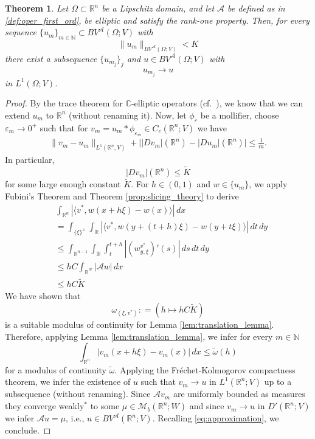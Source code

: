 \documentclass[11pt,reqno]{amsart}
\theoremstyle{plain}
\newtheorem{theorem}{Theorem}[section]
\theoremstyle{definition}
\theoremstyle{remark}
\numberwithin{equation}{section}
\newcommand{\R}{\mathbb{R}}
\newcommand{\C}{\mathbb{C}}
\newcommand{\N}{\mathbb{N}}
\newcommand{\M}{\mathcal{M}}
\newcommand{\A}{\mathcal{A}}
\newcommand{\e}{\varepsilon}
\newcommand{\1}{\mathbbm{1}} %
\begin{document}
\begin{theorem}
\label{thm:compactness}
    Let $\Omega \subset \R^n$ be a Lipschitz domain, and let $\A$ be defined as in \eqref{def:oper_first_ord}, be elliptic and satisfy the rank-one property. Then, for every sequence $\{u_m\}_{m \in \N} \subset BV^\A(\Omega; V)$ with 
    \[
        \| u_m \|_{BV^\A(\Omega;V)} < K
    \]
    there exist a subsequence $\{u_{m_j}\}_j$ and $u \in BV^\A(\Omega; V)$ with 
    \[
        u_{m_j} \to u
    \]
    in $L^1(\Omega; V)$. 
\end{theorem}
\begin{proof}    
    By the trace theorem for $\C$-elliptic operators (cf.\ \cite{BDG20}), we know that we can extend $u_m$ to $\R^n$ (without renaming it). Now, let $\phi_\e$ be a mollifier, choose $\e_m \to 0^+$ such that for $v_m = u_m \ast \phi_{\e_m} \in C_c(\R^n; V)$ we have
    \begin{align}\label{eq:approximation}
        \| v_m - u_m \|_{L^1(\R^n, V)} + \big||Dv_m|(\R^n) - |Du_m|(\R^n) \big| \leq \frac{1}{m}.
    \end{align}
    In particular, 
    \[
        |Dv_m|(\R^n) \leq \tilde K 
    \]
    for some large enough constant $\tilde K$. For $h \in (0,1)$ and $w \in \{u_m\}$, we apply Fubini's Theorem and Theorem \ref{prop:slicing_theory} to derive 
    \begin{align*}
        &\int_{\R^n} |\langle v^*, w(x + h \xi) - w(x) \rangle| \, dx \\
        &= \int_{\{\xi\}^\perp} \int_\R |\langle v^*, w(y + (t + h)\xi) - w(y + t\xi) \rangle| \, dt \, dy \\
        &\leq \int_{\R^{n-1}} \int_\R \int_t^{t + h} |(w^{v^*}_{y, \xi})'(s)| \, ds \, dt \, dy \\
        &\leq h C \int_{\R^N} |\A w| \, dx \\
        &\leq h C\tilde K
    \end{align*}
    We have shown that 
    \[
        \omega_{(\xi, v^*)} : = \left(h \mapsto h C\tilde K \right)
    \]
    is a suitable modulus of continuity for Lemma \ref{lem:translation_lemma}. Therefore, applying Lemma \ref{lem:translation_lemma}, we infer for every $m \in \N$
    \[
        \int_{\R^n} |v_m(x + h \xi)- v_m(x)| \, dx \leq \tilde \omega(h)
    \]
    for a modulus of continuity $\tilde\omega$. Applying the Fréchet-Kolmogorov compactness theorem, we infer the existence of $u$ such that $v_m \to u$ in $L^1(\R^n; V)$ up to a subsequence (without renaming). Since $\A v_m$ are uniformly bounded as measures they converge weakly$^*$ to some $\mu \in \M_b(\R^n; W)$ and since $v_m \to u$ in $D'(\R^n; V)$ we infer $\A u = \mu$, i.e., $u \in BV^\A(\R^n; V)$. Recalling \eqref{eq:approximation}, we conclude.
\end{proof}
\end{document}
